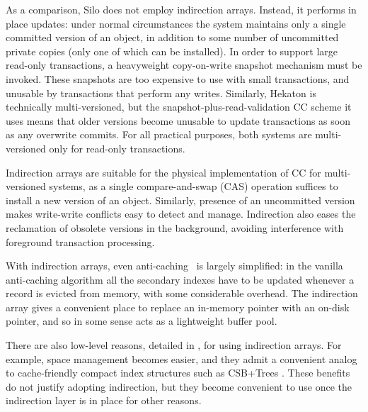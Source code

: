 As a comparison, Silo does not employ indirection arrays. Instead, it performs in place updates: under normal circumstances the system maintains only a single committed version of an object, in addition to some number of uncommitted private copies (only one of which can be installed). In order to support large read-only transactions, a heavyweight copy-on-write snapshot mechanism must be invoked. These snapshots are too expensive to use with small transactions, and unusable by transactions that perform any writes. Similarly, Hekaton is technically multi-versioned, but the snapshot-plus-read-validation CC scheme it uses means that older versions become unusable to update transactions as soon as any overwrite commits. For all practical purposes, both systems are multi-versioned only for read-only transactions.

Indirection arrays are suitable for the physical implementation of CC for multi-versioned systems, as a single compare-and-swap (CAS) operation suffices to install a new version of an object. Similarly, presence of an uncommitted version makes write-write conflicts easy to detect and manage. Indirection also eases the reclamation of obsolete versions in the background, avoiding interference with foreground transaction processing.

With indirection arrays, even anti-caching~\cite{DeBrabantPTSZ13} is largely simplified: in the vanilla anti-caching algorithm all the secondary indexes have to be updated whenever a record is evicted from memory, with some considerable overhead. The indirection array gives a convenient place to replace an in-memory pointer with an on-disk pointer, and so in some sense acts as a lightweight buffer pool. 

There are also low-level reasons, detailed in , for using indirection arrays. For example, space management becomes easier, and they admit a convenient analog to cache-friendly compact index structures such as CSB+Trees \cite{RaoR00}. These benefits do not justify adopting indirection, but they become convenient to use once the indirection layer is in place for other reasons.

